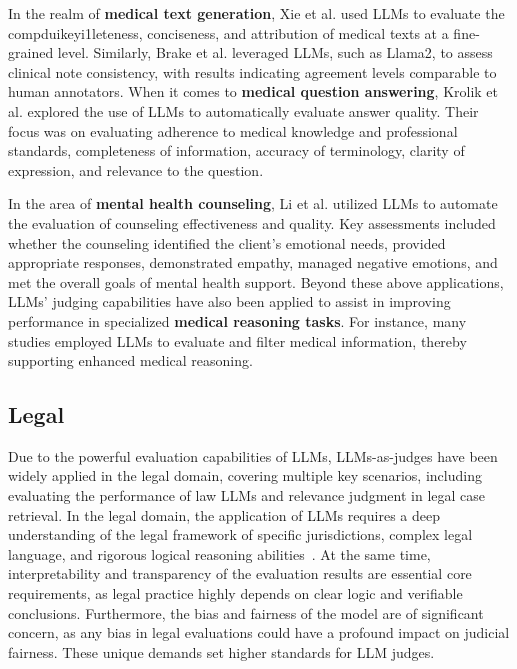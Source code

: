 In the realm of \textbf{medical text generation}, Xie et al. \cite{xie2024doclens} used LLMs to evaluate the compduikeyi1leteness, conciseness, and attribution of medical texts at a fine-grained level. Similarly, Brake et al. \cite{brake2024comparing} leveraged LLMs, such as Llama2, to assess clinical note consistency, with results indicating agreement levels comparable to human annotators. When it comes to \textbf{medical question answering}, Krolik et al. \cite{krolik2024towards} explored the use of LLMs to automatically evaluate answer quality. Their focus was on evaluating adherence to medical knowledge and professional standards, completeness of information, accuracy of terminology, clarity of expression, and relevance to the question. 

In the area of \textbf{mental health counseling}, Li et al. \cite{li2024automatic} utilized LLMs to automate the evaluation of counseling effectiveness and quality. Key assessments included whether the counseling identified the client’s emotional needs, provided appropriate responses, demonstrated empathy, managed negative emotions, and met the overall goals of mental health support. Beyond these above applications, LLMs' judging capabilities have also been applied to assist in improving performance in specialized \textbf{medical reasoning tasks}. For instance, many studies \cite{jeong2024improving} employed LLMs to evaluate and filter medical information, thereby supporting enhanced medical reasoning.

\subsection{Legal}
\label{sec:Legal}


Due to the powerful evaluation capabilities of LLMs, LLMs-as-judges have been widely applied in the legal domain, covering multiple key scenarios, including evaluating the performance of law LLMs and relevance judgment in legal case retrieval. In the legal domain, the application of LLMs requires a deep understanding of the legal framework of specific jurisdictions, complex legal language, and rigorous logical reasoning abilities~\cite{li2024lexevalcomprehensivechineselegal}. At the same time, interpretability and transparency of the evaluation results are essential core requirements, as legal practice highly depends on clear logic and verifiable conclusions. Furthermore, the bias and fairness of the model are of significant concern, as any bias in legal evaluations could have a profound impact on judicial fairness. These unique demands set higher standards for LLM judges.


